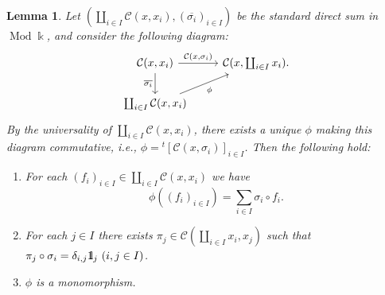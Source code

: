 \documentclass{surv-l}
\numberwithin{equation}{chapter}
\numberwithin{figure}{chapter}
\theoremstyle{plain}
\newtheorem{lem}[thm]{Lemma}
\theoremstyle{definition}
\theoremstyle{remark}
\newcommand{\id}{1\kern-.25em{\text{{\rm l}}}}
\newcommand{\Ar}[3]{\ar[from={#1}, to={#2}, #3]}
\DeclareMathOperator{\Mod}{Mod}
\begin{document}
\begin{lem}\label{lem:compact-mono}
Let $(\coprod_{i\in I}{\mathcal{C}}(x,x_i), (\overline{\sigma_i})_{i\in I})$
be the standard direct sum in $\Mod\Bbbk$, and consider the following diagram:
\begin{equation}\label{eq:univ-coprod1}
\begin{tikzcd}
{\mathcal{C}}(x, x_i) & {\mathcal{C}}(x, \coprod_{i\in I}x_i).\\
\coprod_{i\in I}{\mathcal{C}}(x, x_i)
\Ar{1-1}{1-2}{"{{\mathcal{C}}(x, \sigma_i)}"}
\Ar{1-1}{2-1}{"\overline{\sigma_i}" '}
\Ar{2-1}{1-2}{"\phi" '}
\end{tikzcd}
\end{equation}
By the universality of $\coprod_{i \in I}{\mathcal{C}}(x, x_i)$,
there exists a unique $\phi$ making this diagram commutative,
i.e., $\phi = {}^t[{\mathcal{C}}(x,\sigma_i)]_{i\in I}$.
Then the following hold:
\begin{enumerate}
\item
For each $(f_i)_{i\in I} \in \coprod_{i\in I}{\mathcal{C}}(x, x_i)$
we have
\[
\phi((f_i)_{i\in I}) = \sum_{i\in I}\sigma_i \circ f_i.
\]
\item
For each $j \in I$ there exists $\pi_j \in {\mathcal{C}}(\coprod_{i\in I}x_i, x_j)$ such that
$\pi_j \circ \sigma_i = \delta_{i,j}\id_j\ (i,j \in I)$.
\item
$\phi$ is a monomorphism.
\end{enumerate}
\end{lem}
\end{document}
